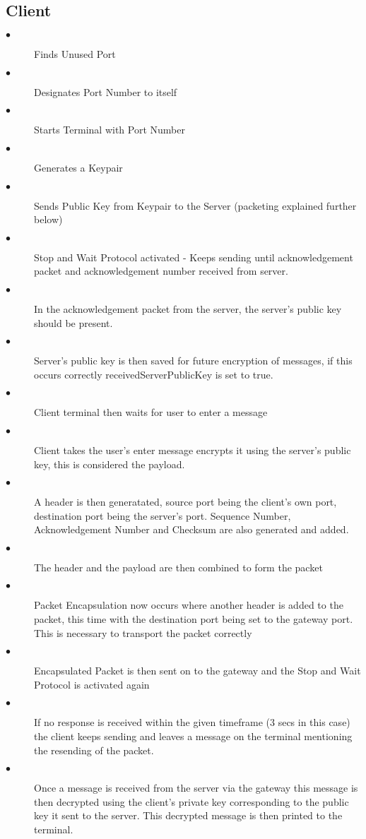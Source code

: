 \documentclass[10pt]{article}
\begin{document}
\subsection{Client}
		\begin{description}
	\item[$\bullet$ ] Finds Unused Port
	\item[$\bullet$ ] Designates Port Number to itself
	\item[$\bullet$ ] Starts Terminal with Port Number
	\item[$\bullet$ ] Generates a Keypair
	\item[$\bullet$ ] Sends Public Key from Keypair to the Server (packeting explained further below)
	\item[$\bullet$ ] Stop and Wait Protocol activated - Keeps sending until acknowledgement packet and acknowledgement number received from server.
	\item[$\bullet$ ] In the acknowledgement packet from the server, the server's public key should be present.
	\item[$\bullet$ ] Server's public key is then saved for future encryption of messages, if this occurs correctly receivedServerPublicKey is set to true.
	\item[$\bullet$ ] Client terminal then waits for user to enter a message
	\item[$\bullet$ ] Client takes the user's enter message encrypts it using the server's public key, this is considered the payload.
	\item[$\bullet$ ] A header is then generatated, source port being the client's own port, destination port being the server's port. Sequence Number, Acknowledgement Number and Checksum are also generated and added.
	\item[$\bullet$ ] The header and the payload are then combined to form the packet
	\item[$\bullet$ ] Packet Encapsulation now occurs where another header is added to the packet, this time with the destination port being set to the gateway port. This is necessary to transport the packet correctly
	\item[$\bullet$ ] Encapsulated Packet is then sent on to the gateway and the Stop and Wait Protocol is activated again
	\item[$\bullet$ ] If no response is received within the given timeframe (3 secs in this case) the client keeps sending and leaves a message on the terminal mentioning the resending of the packet.
	\item[$\bullet$ ] Once a message is received from the server via the gateway this message is then decrypted using the client's private key corresponding to the public key it sent to the server. This decrypted message is then printed to the terminal.

\end{description}
\end{document}
